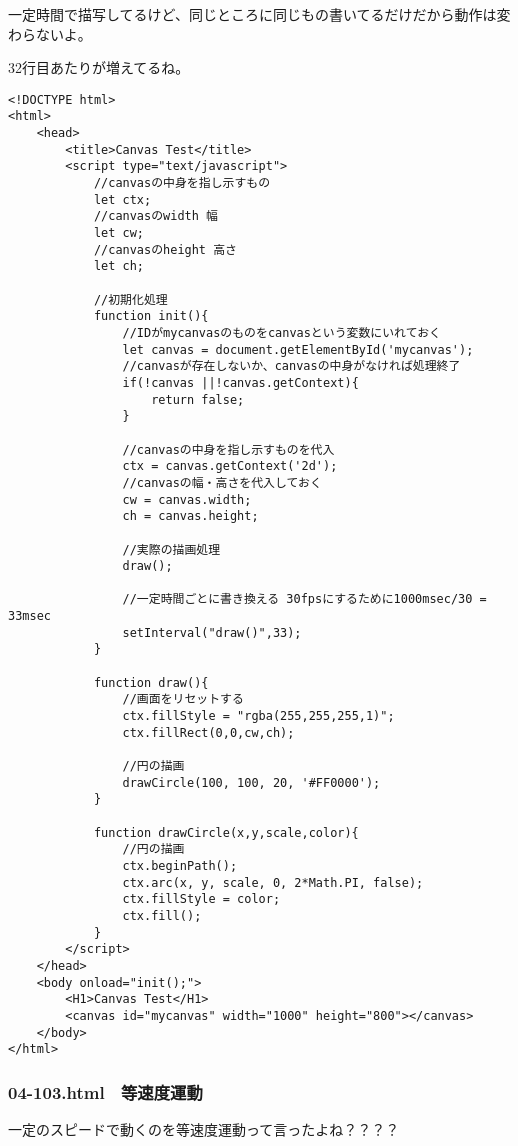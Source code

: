 \documentclass[mingoth,11pt,a4j,uplatex]{jsarticle}
\begin{document}
一定時間で描写してるけど、同じところに同じもの書いてるだけだから動作は変わらないよ。

32行目あたりが増えてるね。
\begin{lstlisting}[caption=一定時間ごとに円を描くけど...動かない]
<!DOCTYPE html>
<html>
	<head>
		<title>Canvas Test</title>
		<script type="text/javascript">
			//canvasの中身を指し示すもの
			let ctx;
			//canvasのwidth 幅
			let cw;
			//canvasのheight 高さ
			let ch;
						
			//初期化処理
			function init(){
				//IDがmycanvasのものをcanvasという変数にいれておく
				let canvas = document.getElementById('mycanvas');
				//canvasが存在しないか、canvasの中身がなければ処理終了
				if(!canvas ||!canvas.getContext){
					return false;
				}
				
				//canvasの中身を指し示すものを代入
				ctx = canvas.getContext('2d');
				//canvasの幅・高さを代入しておく
				cw = canvas.width;
				ch = canvas.height;
				
				//実際の描画処理
				draw();
				
				//一定時間ごとに書き換える 30fpsにするために1000msec/30 = 33msec
				setInterval("draw()",33);
			}
			
			function draw(){
				//画面をリセットする
				ctx.fillStyle = "rgba(255,255,255,1)";
				ctx.fillRect(0,0,cw,ch);
				
				//円の描画
				drawCircle(100, 100, 20, '#FF0000');
			}
			
			function drawCircle(x,y,scale,color){
				//円の描画
				ctx.beginPath();
				ctx.arc(x, y, scale, 0, 2*Math.PI, false);
				ctx.fillStyle = color;
				ctx.fill();
			}
		</script>
	</head>
	<body onload="init();">
		<H1>Canvas Test</H1>
		<canvas id="mycanvas" width="1000" height="800"></canvas>
	</body>
</html>
\end{lstlisting}

\subsubsection{04-103.html　等速度運動}
一定のスピードで動くのを等速度運動って言ったよね？？？？
\end{document}
